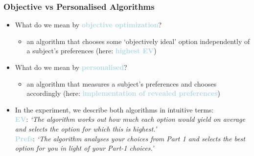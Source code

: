 \documentclass[xcolor=dvipsnames, 10pt]{beamer}
\begin{document}
    \begin{frame}
 	\frametitle{Objective vs Personalised Algorithms\vspace{.3cm}}
 	\begin{itemize}
 	\setlength\itemsep{1em}
 	\item What do we mean by \textcolor{lightblue}{\textbf{objective optimization}}?
   \begin{itemize}
 	\item an algorithm that chooses some `objectively ideal' option independently of a subject's preferences (here: \textcolor{lightblue}{\textbf{highest EV}})\vspace{-.2cm}
    \end{itemize}
 	\item What do we mean by \textcolor{lightblue}{\textbf{personalised}}?
   \begin{itemize}
 	\item an algorithm that measures a subject's preferences and chooses accordingly (here: \textcolor{lightblue}{\textbf{implementation of revealed preferences}})\vspace{-.2cm}
   \end{itemize}
 	\item In the experiment, we describe both algorithms in intuitive terms:\\\medskip \textcolor{lightblue}{\textbf{EV}}: \textit{`The algorithm works out how much each option would yield on average and selects the option for which this is highest.'}\\\smallskip
   \textcolor{lightblue}{\textbf{Prefs}}: \textit{`The algorithm analyses your choices from Part 1 and selects the best option for you in light of your Part-1 choices.'}
  	\end{itemize}
  	\end{frame}
\end{document}
